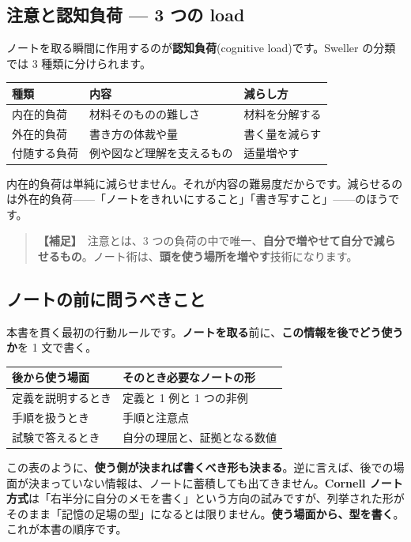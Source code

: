 \documentclass{article}
\begin{document}
\subsection{注意と認知負荷 — 3 つの load}

ノートを取る瞬間に作用するのが\textbf{認知負荷}(cognitive load)です。Sweller の分類では 3 種類に分けられます。

\begin{center}
\begin{tabular}{|l|l|l|}
\hline
種類 & 内容 & 減らし方 \\
\hline
内在的負荷 & 材料そのものの難しさ & 材料を分解する \\
\hline
外在的負荷 & 書き方の体裁や量 & 書く量を減らす \\
\hline
付随する負荷 & 例や図など理解を支えるもの & 适量増やす \\
\hline
\end{tabular}
\end{center}

内在的負荷は単純に減らせません。それが内容の難易度だからです。減らせるのは外在的負荷——「ノートをきれいにすること」「書き写すこと」——のほうです。

\begin{quote}
\textbf{【補足】}\ 注意とは、3 つの負荷の中で唯一、\textbf{自分で増やせて自分で減らせるもの}。ノート術は、\textbf{頭を使う場所を増やす}技術になります。
\end{quote}

\subsection{ノートの前に問うべきこと}

本書を貫く最初の行動ルールです。\textbf{ノートを取る}前に、\textbf{この情報を後でどう使うか}を 1 文で書く。

\begin{center}
\begin{tabular}{|l|l|}
\hline
後から使う場面 & そのとき必要なノートの形 \\
\hline
定義を説明するとき & 定義と 1 例と 1 つの非例 \\
\hline
手順を扱うとき & 手順と注意点 \\
\hline
試験で答えるとき & 自分の理屈と、証拠となる数値 \\
\hline
\end{tabular}
\end{center}

この表のように、\textbf{使う側が決まれば書くべき形も決まる}。逆に言えば、後での場面が決まっていない情報は、ノートに蓄積しても出てきません。\textbf{Cornell ノート方式}は「右半分に自分のメモを書く」という方向の試みですが、列挙された形がそのまま「記憶の足場の型」になるとは限りません。\textbf{使う場面から、型を書く}。これが本書の順序です。
\end{document}
